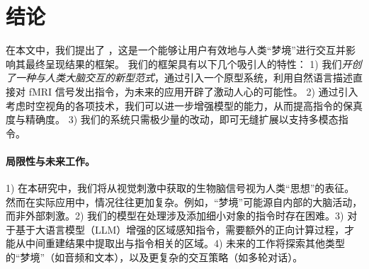 \section{结论}

在本文中，我们提出了 \textbf{\model{}}，这是一个能够让用户有效地与人类“梦境”进行交互并影响其最终呈现结果的框架。
我们的框架具有以下几个吸引人的特性：
1) 我们\emph{开创了一种与人类大脑交互的新型范式}，通过引入一个原型系统，利用自然语言描述直接对 fMRI 信号发出指令，为未来的应用开辟了激动人心的可能性。
2) 通过引入考虑时空视角的各项技术，我们可以进一步增强模型的能力，从而提高指令的保真度与精确度。
3) 我们的系统只需极少量的改动，即可无缝扩展以支持多模态指令。

\paragraph{局限性与未来工作。} 1) 在本研究中，我们将从视觉刺激中获取的生物脑信号视为人类“思想”的表征。然而在实际应用中，情况往往更加复杂。例如，“梦境”可能源自内部的大脑活动，而非外部刺激。2) 我们的模型在处理涉及添加细小对象的指令时存在困难。3) 对于基于大语言模型（LLM）增强的区域感知指令，需要额外的正向计算过程，才能从中间重建结果中提取出与指令相关的区域。4) 未来的工作将探索其他类型的“梦境”（如音频和文本），以及更复杂的交互策略（如多轮对话）。

